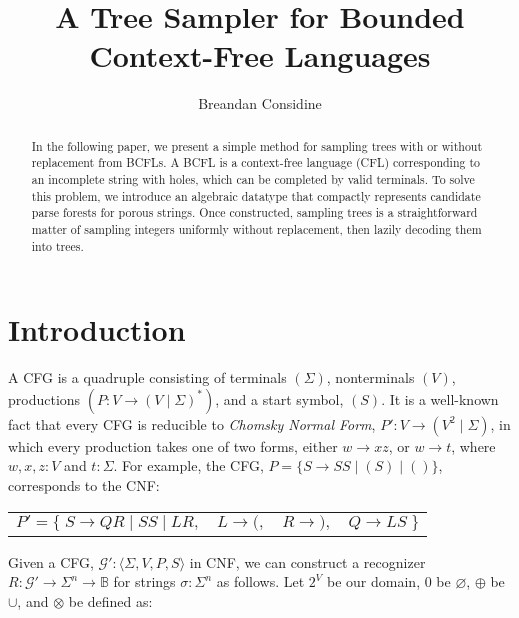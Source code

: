 \documentclass[sigplan,nonacm]{acmart}\settopmatter{printfolios=false,printccs=false,printacmref=false}
\begin{document}
  \title{A Tree Sampler for Bounded Context-Free Languages}
  \begin{abstract}
    In the following paper, we present a simple method for sampling trees with or without replacement from BCFLs. A BCFL is a context-free language (CFL) corresponding to an incomplete string with holes, which can be completed by valid terminals. To solve this problem, we introduce an algebraic datatype that compactly represents candidate parse forests for porous strings. Once constructed, sampling trees is a straightforward matter of sampling integers uniformly without replacement, then lazily decoding them into trees.
  \end{abstract}

  \author{Breandan Considine}

  \maketitle

  \section{Introduction}

  A CFG is a quadruple consisting of terminals $(\Sigma)$, nonterminals $(V)$, productions $(P\colon V \rightarrow (V \mid \Sigma)^*)$, and a start symbol, $(S)$. It is a well-known fact that every CFG is reducible to \textit{Chomsky Normal Form}, $P'\colon V \rightarrow (V^2 \mid \Sigma)$, in which every production takes one of two forms, either $w \rightarrow xz$, or $w \rightarrow t$, where $w, x, z: V$ and $t: \Sigma$. For example, the CFG, $P=\{S \rightarrow S S \mid ( S ) \mid ()\}$, corresponds to the CNF:\vspace{-3pt}

  \begin{table}[H]
    \begin{tabular}{llll}
      $P'=\big\{\;S\rightarrow QR \mid SS \mid LR,$ & $L \rightarrow (,$ & $R \rightarrow ),$ & $Q\rightarrow LS\;\big\}$
    \end{tabular}
  \end{table}\vspace{-8pt}

  \noindent Given a CFG, $\mathcal{G}' : \langle \Sigma, V, P, S\rangle$ in CNF, we can construct a recognizer $R: \mathcal{G}' \rightarrow \Sigma^n \rightarrow \mathbb{B}$ for strings $\sigma: \Sigma^n$ as follows. Let $2^V$ be our domain, $0$ be $\varnothing$, $\oplus$ be $\cup$, and $\otimes$ be defined as:\vspace{-10pt}
\end{document}
